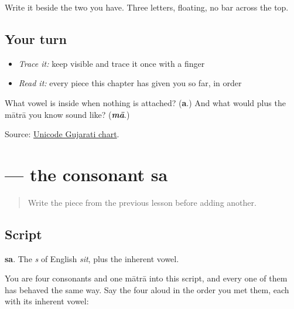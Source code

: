 Write it beside the two you have. Three letters, floating, no bar across the top.

\subsection*{Your turn}
\begin{itemize}
\raggedright
  \item \emph{Trace it:} keep  visible and trace it once with a finger
  \item \emph{Read it:} every piece this chapter has given you so far, in order
\end{itemize}

\begin{tcolorbox}[breakable,colback=teal!4,colframe=teal!35!black,title={Before you move on}]
What vowel is inside \textbf{} when nothing is attached? (\textbf{a}.) And what would \textbf{} plus the mātrā you know sound like? (\emph{\textbf{mā}}.)

Source: \href{https://www.unicode.org/charts/PDF/U0A80.pdf}{Unicode Gujarati chart}.
\end{tcolorbox}
\section[\texorpdfstring{\gu{સ} (sa)}{સ (sa)}]{ — the consonant sa}

\label{lesson:GU-W01-sa}



\begin{quote}
Write the piece from the previous lesson before adding another.
\end{quote}

\subsection*{Script}

\begin{quote}
\end{quote}

\textbf{sa}. The \emph{s} of English \emph{sit}, plus the inherent vowel.

You are four consonants and one mātrā into this script, and every one of them has behaved the same way. Say the four aloud in the order you met them, each with its inherent vowel:

\begin{quote}
\textbf{}   \textbf{}   \textbf{}   \textbf{}
\end{quote}

